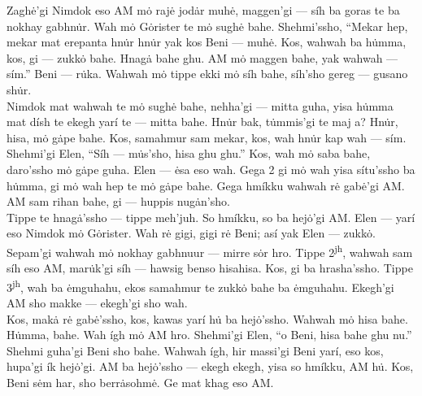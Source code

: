 \documentclass{article}[10pt]
\begin{document}
Zagh\.{e}'gi Nimdok eso AM m\.{o} raj\.{e} jod\.{a}r muh\.{e}, maggen'gi --- s\'{i}h ba goras te ba nokhay gabhn\.{u}r. Wah m\.{o} G\.{o}rister te m\.{o} sugh\.{e} bahe. Shehmi'ssho, ``Mekar hep, mekar mat erepanta hn\.{u}r hn\.{u}r yak kos Beni --- muh\.{e}. Kos, wahwah ba h\.{u}mma, kos, gi --- zukk\.{o} bahe. Hnag\.{a} bahe ghu. AM m\.{o} maggen bahe, yak wahwah --- s\'{i}m.'' Beni --- r\.{u}ka. Wahwah m\.{o} tippe ekki m\.{o} s\'{i}h bahe, s\'{i}h'sho gereg --- gusano sh\.{u}r.\\

Nimdok mat wahwah te m\.{o} sugh\.{e} bahe, nehha'gi --- mitta guha, yisa h\.{u}mma mat d\'{i}sh te ekegh yar\'{i} te --- mitta bahe. Hn\.{u}r bak, t\.{u}mmis'gi te maj a? Hn\.{u}r, hisa, m\.{o} g\.{a}pe bahe. Kos, samahmur sam mekar, kos, wah hn\.{u}r kap wah --- s\'{i}m. Shehmi'gi Elen, ``S\'{i}h --- m\.{u}s'sho, hisa ghu ghu.'' Kos, wah m\.{o} saba bahe, daro'ssho m\.{o} g\.{a}pe guha. Elen --- \.{e}sa eso wah. Gega 2 gi m\.{o} wah yisa s\'{i}tu'ssho ba h\.{u}mma, gi m\.{o} wah hep te m\.{o} g\.{a}pe bahe. Gega hm\'{i}kku wahwah r\.{e} gab\.{e}'gi AM. AM sam rihan bahe, gi --- huppis nug\.{a}n'sho.\\

Tippe te hnag\.{a}'ssho --- tippe meh'juh. So hm\'{i}kku, so ba hej\.{o}'gi AM. Elen --- yar\'{i} eso Nimdok m\.{o} G\.{o}rister. Wah r\.{e} gigi, gigi r\.{e} Beni; as\'{i} yak Elen --- zukk\.{o}. Sepam'gi wahwah m\.{o} nokhay gabhnuur --- mirre s\.{o}r hro. Tippe 2\textsuperscript{jh}, wahwah sam s\'{i}h eso AM, mar\.{u}k'gi s\'{i}h --- hawsig benso hisahisa. Kos, gi ba hrasha'ssho. Tippe 3\textsuperscript{jh}, wah ba \.{e}mguhahu, ekos samahmur te zukk\.{o} bahe ba \.{e}mguhahu. Ekegh'gi AM sho makke --- ekegh'gi sho wah.\\

Kos, mak\.{a} r\.{e} gab\.{e}'ssho, kos, kawas yar\'{i} h\.{u} ba hej\.{o}'ssho. Wahwah m\.{o} hisa bahe. H\.{u}mma, bahe. Wah \'{i}gh m\.{o} AM hro. Shehmi'gi Elen, ``o Beni, hisa bahe ghu nu.'' Shehmi guha'gi Beni sho bahe. Wahwah \'{i}gh, hir massi'gi Beni yar\'{i}, eso kos, hupa'gi \'{i}k hej\.{o}'gi. AM ba hej\.{o}'ssho --- ekegh ekegh, yisa so hm\'{i}kku, AM  h\.{u}. Kos, Beni s\.{e}m har, sho berr\.{a}sohm\.{e}. Ge mat khag eso AM.\\
\end{document}
